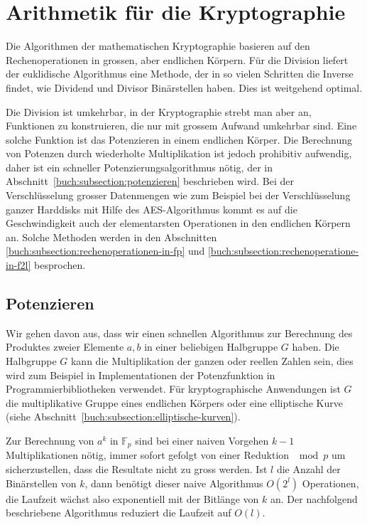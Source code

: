 %
%
%
\section{Arithmetik für die Kryptographie
\label{buch:section:arithmetik-fuer-kryptographie}}
Die Algorithmen der mathematischen Kryptographie basieren
auf den Rechenoperationen in grossen, aber endlichen Körpern.
Für die Division liefert der euklidische Algorithmus eine
Methode, der in so vielen Schritten die Inverse findet,
wie Dividend und Divisor Binärstellen haben.
Dies ist weitgehend optimal.

Die Division ist umkehrbar, in der Kryptographie strebt man aber an,
Funktionen zu konstruieren, die nur mit grossem Aufwand umkehrbar sind.
Eine solche Funktion ist das Potenzieren in einem endlichen Körper.
Die Berechnung von Potenzen durch wiederholte Multiplikation ist jedoch
prohibitiv aufwendig, daher ist ein schneller Potenzierungsalgorithmus
nötig, der in Abschnitt~\ref{buch:subsection:potenzieren} beschrieben
wird.
Bei der Verschlüsselung grosser Datenmengen wie zum Beispiel bei
der Verschlüsselung ganzer Harddisks mit Hilfe des AES-Algorithmus
kommt es auf die Geschwindigkeit auch der elementarsten Operationen
in den endlichen Körpern an.
Solche Methoden werden in den Abschnitten
\ref{buch:subsection:rechenoperationen-in-fp}
und
\ref{buch:subsection:rechenoperatione-in-f2l}
besprochen.

\subsection{Potenzieren
\label{buch:subsection:potenzieren}}
Wir gehen davon aus, dass wir einen schnellen Algorithmus zur
Berechnung des Produktes zweier Elemente $a,b$ in einer
beliebigen Halbgruppe $G$ haben.
Die Halbgruppe $G$ kann die Multiplikation der ganzen oder reellen Zahlen
sein, dies wird zum Beispiel in Implementationen der Potenzfunktion
in Programmierbibliotheken verwendet.
Für kryptographische Anwendungen ist $G$ die multiplikative Gruppe
eines endlichen Körpers oder eine elliptische Kurve
(siehe Abschnitt~\ref{buch:subsection:elliptische-kurven}).

Zur Berechnung von $a^k$ in $\mathbb{F}_p$ sind bei einer naiven Vorgehen
$k-1$ Multiplikationen nötig, immer sofort gefolgt
von einer Reduktion $\mod p$ um sicherzustellen, dass die Resultate
nicht zu gross werden.
Ist $l$ die Anzahl der Binärstellen von $k$, dann benötigt dieser
naive Algorithmus $O(2^l)$ Operationen, die Laufzeit wächst
also exponentiell mit der Bitlänge von $k$ an.
Der nachfolgend beschriebene Algorithmus reduziert die Laufzeit auf
$O(l)$.

